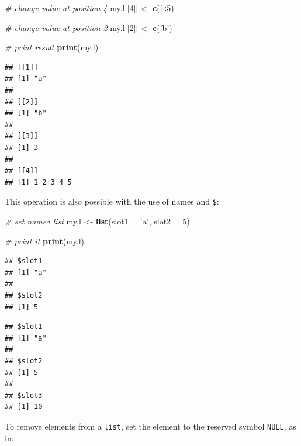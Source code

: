 \documentclass[11pt,]{book}
\newenvironment{Shaded}{\begin{snugshade}}{\end{snugshade}}
\newcommand{\KeywordTok}[1]{\textcolor[rgb]{0.27,0.27,0.27}{\textbf{#1}}}
\newcommand{\DataTypeTok}[1]{\textcolor[rgb]{0.27,0.27,0.27}{#1}}
\newcommand{\DecValTok}[1]{\textcolor[rgb]{0.06,0.06,0.06}{#1}}
\newcommand{\StringTok}[1]{\textcolor[rgb]{0.5,0.5,0.5}{#1}}
\newcommand{\CommentTok}[1]{\textcolor[rgb]{0.56,0.35,0.01}{\textit{#1}}}
\newcommand{\OperatorTok}[1]{\textcolor[rgb]{0.81,0.36,0.00}{\textbf{#1}}}
\newcommand{\NormalTok}[1]{#1}
\begin{document}
\begin{Shaded}
\begin{Highlighting}[]
\CommentTok{# change value at position 4}
\NormalTok{my.l[[}\DecValTok{4}\NormalTok{]] <-}\StringTok{ }\KeywordTok{c}\NormalTok{(}\DecValTok{1}\OperatorTok{:}\DecValTok{5}\NormalTok{)}

\CommentTok{# change value at position 2}
\NormalTok{my.l[[}\DecValTok{2}\NormalTok{]] <-}\StringTok{ }\KeywordTok{c}\NormalTok{(}\StringTok{'b'}\NormalTok{)}

\CommentTok{# print result}
\KeywordTok{print}\NormalTok{(my.l)}
\end{Highlighting}
\end{Shaded}

\begin{verbatim}
## [[1]]
## [1] "a"
## 
## [[2]]
## [1] "b"
## 
## [[3]]
## [1] 3
## 
## [[4]]
## [1] 1 2 3 4 5
\end{verbatim}

This operation is also possible with the use of names and \texttt{\$}:

\begin{Shaded}
\begin{Highlighting}[]
\CommentTok{# set named list}
\NormalTok{my.l <-}\StringTok{ }\KeywordTok{list}\NormalTok{(}\DataTypeTok{slot1 =} \StringTok{'a'}\NormalTok{, }\DataTypeTok{slot2 =} \DecValTok{5}\NormalTok{)}

\CommentTok{# print it}
\KeywordTok{print}\NormalTok{(my.l)}
\end{Highlighting}
\end{Shaded}

\begin{verbatim}
## $slot1
## [1] "a"
## 
## $slot2
## [1] 5
\end{verbatim}

\begin{Shaded}
\end{Shaded}

\begin{verbatim}
## $slot1
## [1] "a"
## 
## $slot2
## [1] 5
## 
## $slot3
## [1] 10
\end{verbatim}

To remove elements from a \texttt{list}, set the element to the reserved
symbol \texttt{NULL}, as in: 
\end{document}
